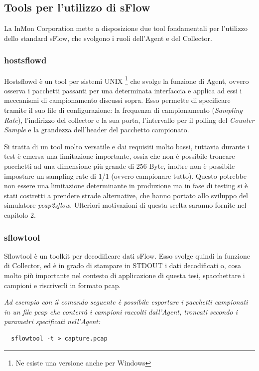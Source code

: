 \documentclass[12pt,a4paper,openright,twoside]{report}
\begin{document}
\subsection{Tools per l'utilizzo di sFlow}

La InMon Corporation mette a disposizione due tool fondamentali per l'utilizzo dello
standard sFlow, che svolgono i ruoli dell'Agent e del Collector.

\subsubsection{hostsflowd}
Hostsflowd \`e un tool per sistemi UNIX \footnote{Ne esiste una versione anche per Windows}
che svolge la funzione di Agent, ovvero osserva
i pacchetti passanti per una determinata interfaccia e applica ad essi i meccanismi di
campionamento discussi sopra. Esso permette di specificare tramite il suo file di configurazione:
la frequenza di campionamento ({\it Sampling Rate}), l'indirizzo del collector e la
sua porta, l'intervallo per il polling del {\it Counter Sample} e la grandezza dell'header
del pacchetto campionato.

Si tratta di un tool molto versatile e dai requisiti molto bassi, tuttavia durante
i test \`e emersa una limitazione importante, ossia che non \`e possibile
troncare pacchetti ad una dimensione pi\`u grande di 256 Byte, inoltre non \`e possibile
impostare un sampling rate di 1/1 (ovvero campionare tutto). Questo potrebbe non essere
una limitazione determinante in produzione ma in fase di testing si \`e stati costretti
a prendere strade alternative, che hanno portato allo sviluppo del simulatore {\it pcap2sflow}.
Ulteriori motivazioni di questa scelta saranno fornite nel capitolo 2.

\subsubsection{sflowtool}

Sflowtool \`e un toolkit per decodificare
dati sFlow. Esso svolge quindi la funzione di Collector, ed \`e in grado di stampare
in STDOUT i dati decodificati o, cosa molto pi\`u importante nel contesto di applicazione
di questa tesi, spacchettare i campioni e
riscriverli in formato pcap.

{\it Ad esempio con il comando seguente \`e possibile esportare i pacchetti campionati
in un file pcap che conterr\`a i campioni raccolti dall'Agent, troncati secondo i
parametri specificati nell'Agent:}
\begin{verbatim}
  sflowtool -t > capture.pcap
\end{verbatim}
\end{document}
